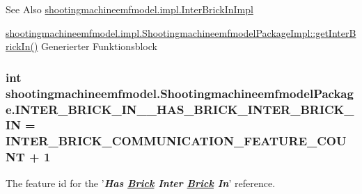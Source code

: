 \begin{DoxySeeAlso}{See Also}
\hyperlink{classshootingmachineemfmodel_1_1impl_1_1_inter_brick_in_impl}{shootingmachineemfmodel.\-impl.\-Inter\-Brick\-In\-Impl} 

\hyperlink{classshootingmachineemfmodel_1_1impl_1_1_shootingmachineemfmodel_package_impl_acc0e584aa945ef34920ace489b75a971}{shootingmachineemfmodel.\-impl.\-Shootingmachineemfmodel\-Package\-Impl\-::get\-Inter\-Brick\-In()} Generierter Funktionsblock 
\end{DoxySeeAlso}
\hypertarget{interfaceshootingmachineemfmodel_1_1_shootingmachineemfmodel_package_abf05108d681763ab485386ed65edaaf6}{
\subsubsection[{I\-N\-T\-E\-R\-\_\-\-B\-R\-I\-C\-K\-\_\-\-I\-N\-\_\-\-\_\-\-H\-A\-S\-\_\-\-B\-R\-I\-C\-K\-\_\-\-I\-N\-T\-E\-R\-\_\-\-B\-R\-I\-C\-K\-\_\-\-I\-N}]{\setlength{\rightskip}{0pt plus 5cm}int shootingmachineemfmodel.\-Shootingmachineemfmodel\-Package.\-I\-N\-T\-E\-R\-\_\-\-B\-R\-I\-C\-K\-\_\-\-I\-N\-\_\-\-\_\-\-H\-A\-S\-\_\-\-B\-R\-I\-C\-K\-\_\-\-I\-N\-T\-E\-R\-\_\-\-B\-R\-I\-C\-K\-\_\-\-I\-N = {\bf I\-N\-T\-E\-R\-\_\-\-B\-R\-I\-C\-K\-\_\-\-C\-O\-M\-M\-U\-N\-I\-C\-A\-T\-I\-O\-N\-\_\-\-F\-E\-A\-T\-U\-R\-E\-\_\-\-C\-O\-U\-N\-T} + 1}}\label{interfaceshootingmachineemfmodel_1_1_shootingmachineemfmodel_package_abf05108d681763ab485386ed65edaaf6}
The feature id for the '{\itshape {\bfseries Has \hyperlink{interfaceshootingmachineemfmodel_1_1_brick}{Brick} Inter \hyperlink{interfaceshootingmachineemfmodel_1_1_brick}{Brick} In}}' reference.


